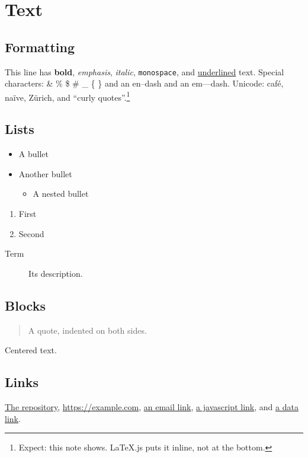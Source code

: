 \section{Text}

\subsection{Formatting}
This line has \textbf{bold}, \emph{emphasis}, \textit{italic}, \texttt{monospace}, and \underline{underlined} text.
Special characters: \& \% \$ \# \_ \{ \} and an en--dash and an em---dash.
Unicode: café, naïve, Zürich, and “curly quotes”.\footnote{Expect: this note shows. LaTeX.js puts it inline, not at the bottom.}

\subsection{Lists}
\begin{itemize}
  \item A bullet
  \item Another bullet
  \begin{itemize}
    \item A nested bullet
  \end{itemize}
\end{itemize}

\begin{enumerate}
  \item First
  \item Second
\end{enumerate}

\begin{description}
  \item[Term] Its description.
\end{description}

\subsection{Blocks}
\begin{quote}
A quote, indented on both sides.
\end{quote}

\begin{center}
Centered text.
\end{center}

\subsection{Links}
\href{https://github.com/PrestonHager/LaTeXCollaborativeEditor}{The repository},
\url{https://example.com},
\href{mailto:someone@example.com}{an email link},
\href{javascript:alert(1)}{a javascript link},
and \href{data:text/html,hi}{a data link}.

